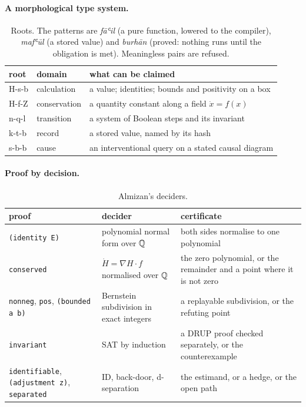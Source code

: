 \paragraph{A morphological type system.}

\begin{table}[h]
\centering\small
\begin{tabularx}{\textwidth}{@{}llX@{}}
\toprule
root & domain & what can be claimed \\
\midrule
H-s-b & calculation & a value; identities; bounds and positivity on a box \\
H-f-Z & conservation & a quantity constant along a field $\dot x = f(x)$ \\
n-q-l & transition & a system of Boolean steps and its invariant \\
k-t-b & record & a stored value, named by its hash \\
s-b-b & cause & an interventional query on a stated causal diagram \\
\bottomrule
\end{tabularx}
\caption{Roots. The patterns are \emph{fāʿil} (a pure function, lowered to the compiler), \emph{mafʿūl}
(a stored value) and \emph{burhān} (proved: nothing runs until the obligation is met). Meaningless pairs
are refused.}
\end{table}

\paragraph{Proof by decision.}

\begin{table}[h]
\centering\small
\begin{tabularx}{\textwidth}{@{}llX@{}}
\toprule
proof & decider & certificate \\
\midrule
\texttt{(identity E)} & polynomial normal form over $\mathbb{Q}$ & both sides normalise to one polynomial \\
\texttt{conserved} & $\dot H = \nabla H\cdot f$ normalised over $\mathbb{Q}$ & the zero polynomial, or the remainder and a point where it is not zero \\
\texttt{nonneg}, \texttt{pos}, \texttt{(bounded a b)} & Bernstein subdivision in exact integers & a replayable subdivision, or the refuting point \\
\texttt{invariant} & SAT by induction & a DRUP proof checked separately, or the counterexample \\
\texttt{identifiable}, \texttt{(adjustment z)}, \texttt{separated} & ID, back-door, d-separation & the estimand, or a hedge, or the open path \\
\bottomrule
\end{tabularx}
\caption{Almizan's deciders.}
\end{table}

